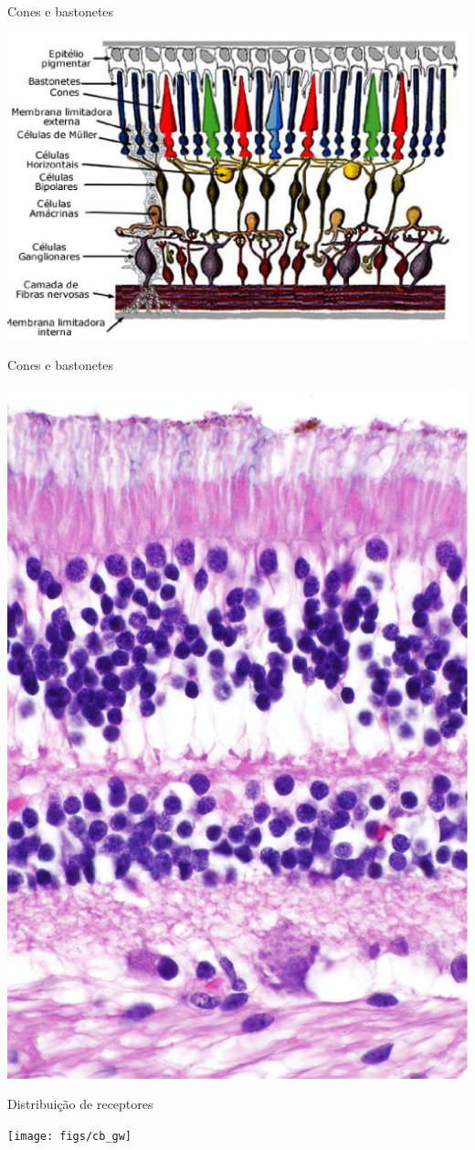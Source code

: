       \begin{slide}[toc=]{Cones e bastonetes}
         \begin{center}
            \includegraphics[width=.7\textwidth]{figs/retina}
         \end{center}
      \end{slide}
      \begin{slide}[toc=]{Cones e bastonetes}
         \begin{center}
            \includegraphics[width=.3\textwidth]{figs/retina2}
         \end{center}
      \end{slide}

      \begin{slide}[toc=]{Distribuição de receptores}
         \begin{center}
            \texttt{[image: figs/cb\_gw]}
         \end{center}
      \end{slide}
     

